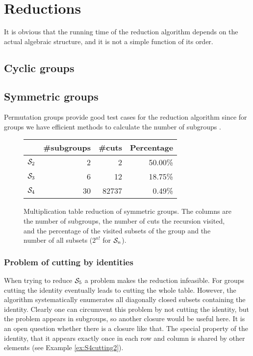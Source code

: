 \documentclass{article}
\theoremstyle{plain}
\theoremstyle{definition}
\newcommand{\cS}{{\cal S}}
\begin{document}
\section{Reductions}

It is obvious that the running time of the reduction algorithm depends on the actual algebraic structure, and it is not a simple function of its  order. 

\subsection{Cyclic groups}



\subsection{Symmetric groups}

Permutation groups provide good test cases for the reduction algorithm since for groups we have efficient methods to calculate the number of subgroups \cite{CGTHandbook}.
\begin{figure}
\begin{center}
\begin{tabular}{|l|r|r|r|}
\hline
 & \#subgroups & \#cuts & Percentage\\
\hline
$\cS_2$ & 2 & 2 & 50.00\% \\
\hline
$\cS_3$ & 6 & 12 & 18.75\% \\
\hline
$\cS_4$ & 30 & 82737 & 0.49\% \\
\hline
\end{tabular}
\end{center}
\caption{Multiplication table reduction of symmetric groups. The columns are the number of subgroups, the number of cuts the recursion visited, and the percentage of the visited subsets of the group and the number of all subsets ($2^{n!}$ for $\cS_n$).}
\end{figure}

\subsubsection{Problem of cutting by identities}
When trying to reduce $\cS_5$ a problem makes the reduction infeasible. For groups  cutting the identity eventually leads to cutting the whole table. However, the algorithm systematically enumerates all diagonally closed subsets containing the identity. Clearly one can circumvent this problem by  not cutting the identity, but  the problem appears in subgroups, so another closure would be useful here. It is an open question whether there is a closure like that. The special property of the identity, that it appears exactly once in each row and column is shared by other elements (see Example \ref{ex:S4cutting2}).  
\end{document}
